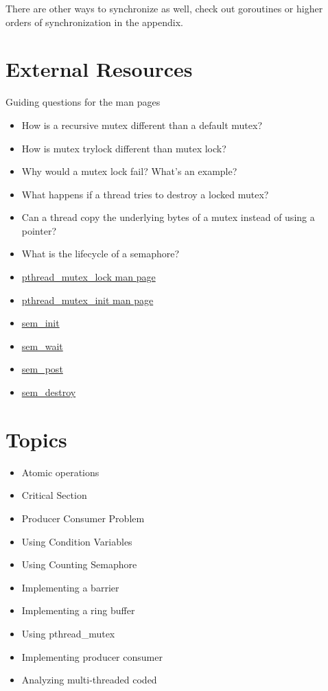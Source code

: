 There are other ways to synchronize as well, check out goroutines or higher orders of synchronization in the appendix.

\section{External Resources}

Guiding questions for the man pages

\begin{itemize}
\item How is a recursive mutex different than a default mutex?
\item How is mutex trylock different than mutex lock?
\item Why would a mutex lock fail? What's an example?
\item What happens if a thread tries to destroy a locked mutex?
\item Can a thread copy the underlying bytes of a mutex instead of using a pointer?
\item What is the lifecycle of a semaphore?
\end{itemize}

\begin{itemize}
\item \href{http://linux.die.net/man/3/pthread_mutex_lock}{pthread\_mutex\_lock man page}
\item \href{http://linux.die.net/man/3/pthread_mutex_init}{pthread\_mutex\_init man page}
\item \href{http://man7.org/linux/man-pages/man3/sem_init.3.html}{sem\_init}
\item \href{http://man7.org/linux/man-pages/man3/sem_wait.3.html}{sem\_wait}
\item \href{http://man7.org/linux/man-pages/man3/sem_post.3.html}{sem\_post}
\item \href{http://man7.org/linux/man-pages/man3/sem_destroy.3.html}{sem\_destroy}
\end{itemize}


\section{Topics}

\begin{itemize}
\tightlist
\item
  Atomic operations
\item
  Critical Section
\item
  Producer Consumer Problem
\item
  Using Condition Variables
\item
  Using Counting Semaphore
\item
  Implementing a barrier
\item
  Implementing a ring buffer
\item
  Using pthread\_mutex
\item
  Implementing producer consumer
\item
  Analyzing multi-threaded coded
\end{itemize}

